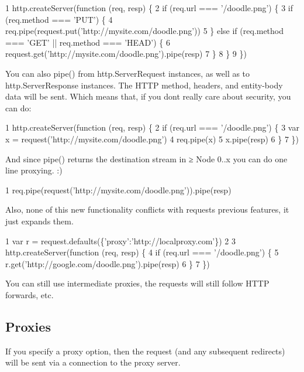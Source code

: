 \begin{DoxyCode}
1 http.createServer(function (req, resp) \{
2   if (req.url === '/doodle.png') \{
3     if (req.method === 'PUT') \{
4       req.pipe(request.put('http://mysite.com/doodle.png'))
5     \} else if (req.method === 'GET' || req.method === 'HEAD') \{
6       request.get('http://mysite.com/doodle.png').pipe(resp)
7     \}
8   \}
9 \})
\end{DoxyCode}


You can also {\ttfamily pipe()} from {\ttfamily http.\+Server\+Request} instances, as well as to {\ttfamily http.\+Server\+Response} instances. The H\+T\+T\+P method, headers, and entity-\/body data will be sent. Which means that, if you don\textquotesingle{}t really care about security, you can do\+:


\begin{DoxyCode}
1 http.createServer(function (req, resp) \{
2   if (req.url === '/doodle.png') \{
3     var x = request('http://mysite.com/doodle.png')
4     req.pipe(x)
5     x.pipe(resp)
6   \}
7 \})
\end{DoxyCode}


And since {\ttfamily pipe()} returns the destination stream in ≥ Node 0..\+x you can do one line proxying. \+:)


\begin{DoxyCode}
1 req.pipe(request('http://mysite.com/doodle.png')).pipe(resp)
\end{DoxyCode}


Also, none of this new functionality conflicts with requests previous features, it just expands them.


\begin{DoxyCode}
1 var r = request.defaults(\{'proxy':'http://localproxy.com'\})
2 
3 http.createServer(function (req, resp) \{
4   if (req.url === '/doodle.png') \{
5     r.get('http://google.com/doodle.png').pipe(resp)
6   \}
7 \})
\end{DoxyCode}


You can still use intermediate proxies, the requests will still follow H\+T\+T\+P forwards, etc.

\subsection*{Proxies}

If you specify a {\ttfamily proxy} option, then the request (and any subsequent redirects) will be sent via a connection to the proxy server.

